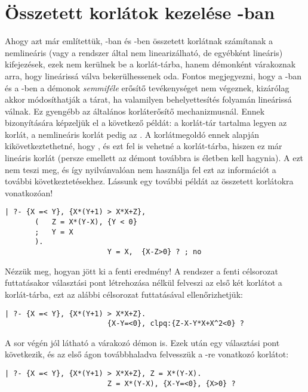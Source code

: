 \section{Összetett korlátok kezelése \Clpq-ban}

Ahogy azt már említettük, \Clpq-ban és \Clpr-ben összetett korlátnak
számítanak a nemlineáris (vagy a rendszer által nem linearizálható, de
egyébként lineáris) kifejezések, ezek nem kerülnek be a korlát-tárba, hanem
démonként várakoznak arra, hogy lineárissá válva bekerülhessenek oda.
Fontos megjegyezni, hogy a \Clpq-ban és a \Clpr-ben a démonok
\emph{semmiféle} erősítő tevékenységet nem végeznek, kizárólag akkor
módosíthatják a tárat, ha valamilyen behelyettesítés folyamán lineárissá
válnak. Ez gyengébb az általános korláterősítő mechanizmusnál. Ennek
bizonyítására képzeljük el a következő példát: a korlát-tár tartalma legyen
az  korlát, a nemlineáris korlát pedig az . A
korlátmegoldó ennek alapján kikövetkeztethetné, hogy , és ezt
fel is vehetné a korlát-tárba, hiszen ez már lineáris korlát (persze emellett
az  démont továbbra is életben kell hagynia). A  ezt
nem teszi meg, és így nyilvánvalóan nem használja fel ezt az információt
a további következtetésekhez.
\br
Lássunk egy további példát az összetett korlátokra vonatkozóan!

\begin{verbatim}
| ?- {X =< Y}, {X*(Y+1) > X*X+Z}, 
       (   Z = X*(Y-X), {Y < 0}
       ;   Y = X
       ).
                        Y = X,  {X-Z>0} ? ; no
\end{verbatim}

Nézzük meg, hogyan jött ki a fenti eredmény! A rendszer a fenti célsorozat
futtatásakor választási pont létrehozása nélkül felveszi az első két korlátot
a korlát-tárba, ezt az alábbi célsorozat futtatásával ellenőrizhetjük:

\begin{verbatim}
| ?- {X =< Y}, {X*(Y+1) > X*X+Z}.
                        {X-Y=<0}, clpq:{Z-X-Y*X+X^2<0} ?
\end{verbatim}

A sor végén jól látható a várakozó démon is. Ezek után egy választási pont
következik, és az első ágon továbbhaladva felvesszük a -re vonatkozó
korlátot:

\begin{verbatim}
| ?- {X =< Y}, {X*(Y+1) > X*X+Z}, Z = X*(Y-X).
                        Z = X*(Y-X), {X-Y=<0}, {X>0} ? 
\end{verbatim}

